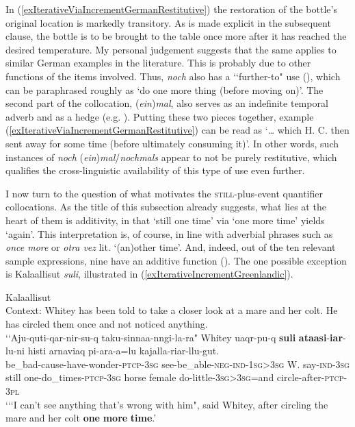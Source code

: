 In (\ref{exIterativeViaIncrementGermanRestitutive}) the restoration of the bottle's original location is markedly transitory. As is made explicit in the subsequent clause, the bottle is to be brought to the table once more after it has reached the desired temperature. My personal judgement suggests that the same applies to similar German examples in the literature. This is probably due to other functions of the items involved. Thus, \textit{noch} also has a \lq\lq further-to" use (), which can be paraphrased roughly as \lq do one more thing (before moving on)\rq{}. The second part of the collocation, (\textit{ein})\textit{mal}, also serves as an indefinite temporal adverb and as a hedge (e.g. \cite[s.v. \textit{mal}]{Duden}). Putting these two pieces together, example (\ref{exIterativeViaIncrementGermanRestitutive}) can be read as \lq … which H. C. then sent away for some time (before ultimately consuming it)'. In other words, such instances of \textit{noch} (\textit{ein})\textit{mal}/\textit{nochmals} appear to not be purely restitutive, which qualifies the cross-linguistic availability of this type of use even further.

I now turn to the question of what motivates the \textsc{still}-plus-event quantifier collocations. As the title of this subsection already suggests, what lies at the heart of them is additivity, in that \lq still one time' via \lq one more time' yields \lq again'. This interpretation is, of course, in line with adverbial phrases such as  \textit{once more} or  \textit{otra vez} lit. \lq{}(an)other time'. And, indeed, out of the ten relevant sample expressions, nine have an additive function (). The one possible exception is Kalaallisut \textit{suli}, illustrated in (\ref{exIterativeIncrementGreenlandic}).

\begin{exe}
	\ex Kalaallisut\\
	 Context: Whitey has been told to take a closer look at a mare and her colt. He has circled them once and not noticed anything.\label{exIterativeIncrementGreenlandic}\\
	\gll \lq\lq Aju-quti-qar-nir-su-q taku-sinnaa-nngi-la-ra" Whitey uaqr-pu-q \textbf{suli} \textbf{ataasi}-\textbf{iar}-lu-ni histi arnaviaq pi-ara-a=lu kajalla-riar-llu-gut.\\
	\phantom{\lq\lq}be\_bad-cause-have-wonder-\textsc{ptcp}-3\textsc{sg} see-be\_able-\textsc{neg}-\textsc{ind}-1\textsc{sg}>3\textsc{sg} W. say-\textsc{ind}-3\textsc{sg} still one-do\_times-\textsc{ptcp}-3\textsc{sg} horse female do-little-3\textsc{sg}>3\textsc{sg}=and circle-after-\textsc{ptcp}-3\textsc{pl}\\
	\glt \lq {\lq\lq}I can’t see anything that’s wrong with him", said Whitey, after circling the mare and her colt \textbf{one} \textbf{more} \textbf{time}.\rq{ }\parencite[Hesti piaraq tappiitsoq]{BittnerTexts}
\end{exe}

